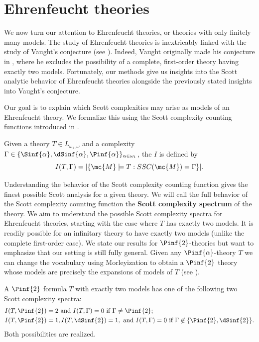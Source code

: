 \documentclass{amsart}
\renewcommand{\-}{\text{-}}
\begin{document}
\section{Ehrenfeucht theories}
We now turn our attention to Ehrenfeucht theories, or theories with only finitely many models.
The study of Ehrenfeucht theories is inextricably linked with the study of Vaught's conjecture (see \cite{PT25}).
Indeed, Vaught originally made his conjecture in \cite{Vau61}, where he excludes the possibility of a complete, first-order theory having exactly two models. 
Fortunately, our methods give us insights into the Scott analytic behavior of Ehrenfeucht theories alongside the previously stated insights into Vaught's conjecture.

Our goal is to explain which Scott complexities may arise as models of an Ehrenfeucht theory.
We formalize this using the Scott complexity counting functions introduced in \cite{GLRS}.

\begin{definition}
	Given a theory $T\in L_{\omega_1,\omega}$ and a complexity $\Gamma\in\{\Sinf{\alpha},\dSinf{\alpha},\Pinf{\alpha}\}_{\alpha\in\omega_1}$, the  $I$ is defined by
    \[ I(T,\Gamma) = |\{\mc{M}\models T : SSC(\mc{M})=\Gamma\}| .\]
\end{definition}

Understanding the behavior of the Scott complexity counting function gives the finest possible Scott analysis for a given theory.
We will call the full behavior of the Scott complexity counting function the \textbf{Scott complexity spectrum} of the theory.
We aim to understand the possible Scott complexity spectra for Ehrenfeucht theories, starting with the case where $T$ has exactly two models.
It is readily possible for an infinitary theory to have exactly two models (unlike the complete first-order case).
We state our results for $\Pinf{2}$-theories but want to emphasize that our setting is still fully general. Given any $\Pinf{\alpha}$-theory $T$ we can change the vocabulary using Morleyization to obtain a $\Pinf{2}$ theory whose models are precisely the expansions of models of $T$ (see \cite[Chapter II.5]{Part2}).

\begin{proposition}\label{prop:2ModelsClassified}
A $\Pinf{2}$ formula $T$ with exactly two models has one of the following two Scott complexity spectra:
\begin{align} &I(T,\Pinf{2})=2 \text{ and } I(T,\Gamma)=0 \text{ if $\Gamma\neq \Pinf{2}$};\\
 &I(T,\Pinf{2})=1,  I(T,\dSinf{2})=1, \text{ and } I(T,\Gamma)=0 \text{ if $\Gamma\not\in \{\Pinf{2},\dSinf{2}\}$.}\end{align}%
Both possibilities are realized.
\end{proposition}
\end{document}
